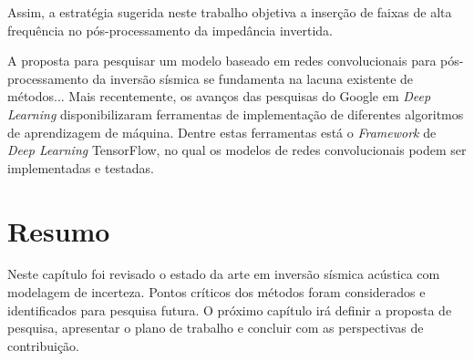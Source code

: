 Assim, a estratégia sugerida neste trabalho objetiva a inserção de faixas de alta frequência
no pós-processamento da impedância invertida.


A proposta para pesquisar um modelo baseado em redes convolucionais para pós-processamento
da inversão sísmica se fundamenta na lacuna existente de métodos...
Mais recentemente, os avanços das pesquisas do Google em \textit{Deep Learning} disponibilizaram
ferramentas de implementação de diferentes algoritmos de aprendizagem de máquina. Dentre estas
ferramentas está o \textit{Framework} de \textit{Deep Learning} TensorFlow, no qual os modelos
de redes convolucionais podem ser implementadas e testadas.


\section{Resumo}

Neste capítulo foi revisado o estado da arte em inversão sísmica acústica
com modelagem de incerteza. Pontos críticos dos métodos foram considerados e
identificados para pesquisa futura. O próximo capítulo irá definir a proposta de
pesquisa, apresentar o plano de trabalho e concluir com as perspectivas de
contribuição.
